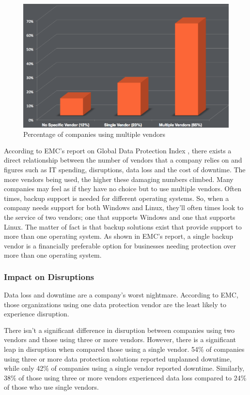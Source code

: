 \begin{figure}[t]
    \begin{center}
        \includegraphics[scale=0.3]{images/graph1.png}
    \end{center}
    \caption{Percentage of companies using multiple vendors}
    \label{fig:graph1}
\end{figure}

According to EMC's report on Global Data Protection Index %
, there exists a direct relationship between the number of vendors that
a company relies on and figures such as IT spending, disruptions, data
loss and the cost of downtime. The more vendors being used, the higher
these damaging numbers climbed. Many companies may feel as if they have
no choice but to use multiple vendors. Often times, backup support is
needed for different operating systems. So, when a company needs support
for both Windows and Linux, they'll often times look to the service of
two vendors; one that supports Windows and one that supports Linux. The
matter of fact is that backup solutions exist that provide support to
more than one operating system. As shown in EMC's report, a single
backup vendor is a financially preferable option for businesses needing
protection over more than one operating system.


\subsubsection{Impact on Disruptions}

Data loss and downtime are a company's worst nightmare. According to
EMC, those organizations using one data protection vendor are the least
likely to experience disruption.

There isn't a significant difference in disruption between companies
using two vendors and those using three or more vendors. However, there
is a significant leap in disruption when compared those using a single
vendor. 54\% of companies using three or more data protection solutions
reported unplanned downtime, while only 42\% of companies using a single
vendor reported downtime. Similarly, 38\% of those using three or more
vendors experienced data loss compared to 24\% of those who use single
vendors.


